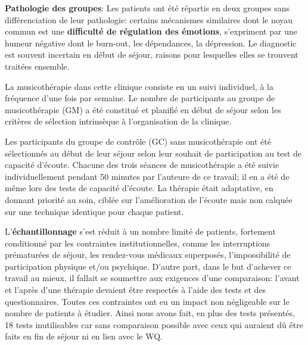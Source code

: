  
 \textbf{ Pathologie des groupes}: Les patients ont été répartis en deux groupes sans différenciation de
 leur pathologie:   
 certains mécanismes
 similaires dont le
 noyau commun est une
 \textbf{difficulté de
 	régulation des
 	émotions},
 s'expriment  par une
 humeur négative dont le burn-out, les dépendances, la dépression.
 Le diagnostic est souvent incertain en début de séjour, raisons pour lesquelles elles
 se trouvent traitées ensemble.
 
 La musicothérapie dans cette clinique consiste en un suivi individuel, à la fréquence d'une fois par 
 semaine.
   Le  nombre de participants au groupe de musicothérapie (GM)  a été  constitué  et planifié en début 
   de séjour selon les critères de sélection 
   intrinsèque à  l'organisation de la clinique.
  
  Les participants du groupe de contrôle (GC) sans musicothérapie  ont été sélectionnés au début 
  de leur séjour selon leur souhait de participation au test de capacité d'écoute.
Chacune des trois  séances de musicothérapie a été suivie individuellement pendant 50 minutes par 
 l'auteure de ce 
 travail; 
  il en a été de même lors des tests de capacité d'écoute.
   La thérapie était 
   adaptative, en donnant priorité au soin, ciblée sur l'amélioration de l'écoute mais non calquée sur une 
   technique identique pour 
   chaque 
   patient.
   
 
 
 L'\textbf{échantillonnage} s'est réduit à un nombre limité de
 patients, fortement conditionné par les contraintes
 institutionnelles, comme les interruptions prématurées de séjour, les rendez-vous
 médicaux superposés, l'impossibilité de participation physique et/ou
 psychique.
D'autre part, dans le but d'achever ce travail au mieux, il fallait se soumettre aux exigences d'une 
 comparaison:  l'avant et l'après d'une thérapie devaient être respectés à l'aide des tests et des 
 questionnaires.
 Toutes ces contraintes ont  eu un impact non négligeable 
 sur le nombre de patients à étudier. 
 Ainsi nous avons fait, en plus des tests présentés, 18  tests  
 inutilisables car sans comparaison possible avec ceux qui auraient dû être faits en fin de séjour ni en lien 
 avec le WQ.
 

